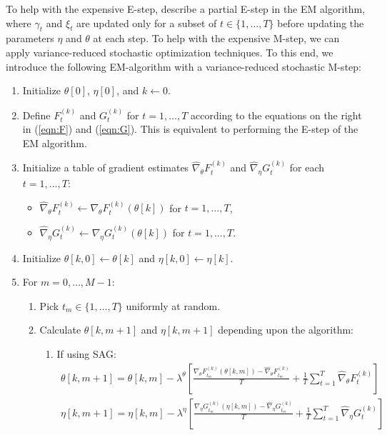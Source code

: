 To help with the expensive E-step, \citet{Neal:1998} describe a partial E-step in the EM algorithm, where $\gamma_t$ and $\xi_t$ are updated only for a subset of $t \in \{1,\ldots,T\}$ before updating the parameters $\eta$ and $\theta$ at each step. To help with the expensive M-step, we can apply variance-reduced stochastic optimization techniques. To this end, we introduce the following EM-algorithm with a variance-reduced stochastic M-step:

\begin{enumerate}
    \item Initialize $\theta[0]$, $\eta[0]$, and $k \leftarrow 0$.
    \item Define $F_t^{(k)}$ and $G_t^{(k)}$ for $t = 1, \ldots, T$ according to the equations on the right in (\ref{eqn:F}) and (\ref{eqn:G}). This is equivalent to performing the E-step of the EM algorithm.
    \item Initialize a table of gradient estimates $\widehat \nabla_\theta F_t^{(k)}$ and $\widehat \nabla_\eta G_t^{(k)}$ for each $t = 1,\ldots,T$:
    \begin{itemize}
        \item $\widehat \nabla_\theta F_{t}^{(k)} \leftarrow \nabla_\theta F_{t}^{(k)}(\theta[k])$ for $t = 1,\ldots,T$,
        \item $\widehat \nabla_\eta G_{t}^{(k)} \leftarrow \nabla_\eta G_{t}^{(k)}(\theta[k])$ for $t = 1,\ldots,T$.
    \end{itemize}
    \item Initialize $\theta[k,0] \leftarrow \theta[k]$ and $\eta[k,0] \leftarrow \eta[k]$.
    \item For $m = 0,\ldots,M-1$:
    \begin{enumerate}
        \item Pick $t_m \in \{1,\ldots,T\}$ uniformly at random.
        \item Calculate $\theta[k,m+1]$ and $\eta[k,m+1]$ depending upon the algorithm:
        \begin{enumerate}
            \item If using SAG:
            \begin{gather}
                \theta[k,m+1] = \theta[k,m] - \lambda^{\theta} \left[\frac{\nabla_\theta F_{t_m}^{(k)}(\theta[k,m]) - \widehat \nabla_\theta F_{t_m}^{(k)}}{T} + \frac{1}{T} \sum_{t=1}^T \widehat \nabla_\theta F^{(k)}_{t} \right] \\
                \eta[k,m+1] = \eta[k,m] - \lambda^{\eta} \left[\frac{\nabla_\eta G_{t_m}^{(k)}(\eta[k,m]) - \widehat \nabla_\eta G_{t_m}^{(k)}}{T} + \frac{1}{T} \sum_{t=1}^T \widehat \nabla_\eta G^{(k)}_{t} \right]

\end{gather}
\end{enumerate}
\end{enumerate}
\end{enumerate}
